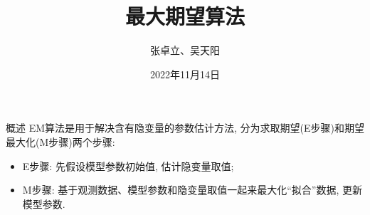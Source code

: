 \documentclass[UTF8]{ctexbeamer}
\title{最大期望算法}
\author{张卓立、吴天阳}
\institute{强基数学001\& 002}
\date{2022年11月14日}
\begin{document}
        \maketitle
    
    \begin{frame}{概述}
        EM算法是用于解决含有隐变量的参数估计方法, 分为求取期望(E步骤)和期望最大化(M步骤)两个步骤: 
        \begin{itemize}
            \item E步骤: 先假设模型参数初始值, 估计隐变量取值;
            \item M步骤: 基于观测数据、模型参数和隐变量取值一起来最大化``拟合''数据, 更新模型参数.
        \end{itemize}
    \end{frame}
\end{document}
